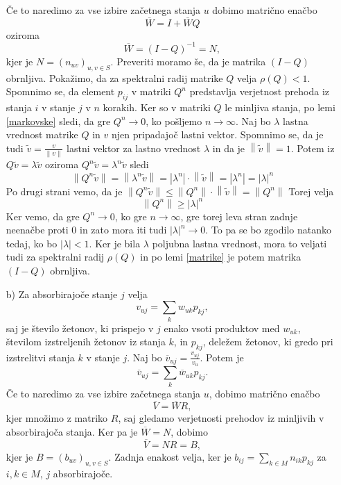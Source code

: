 \documentclass[twoside,11pt]{article}
\begin{document}
\begin{enumerate}
\noindent Če to naredimo za vse izbire začetnega stanja $u$ dobimo matrično enačbo
$$\overline{W} = I + \overline{W}Q$$
oziroma
$$\overline{W} = (I - Q)^{-1} = N,$$
kjer je $N=(n_{uv})_{u,v \in S}$. Preveriti moramo še, da je matrika $(I-Q)$ obrnljiva. Pokažimo, da za spektralni radij matrike $Q$ velja $\rho(Q) < 1$. Spomnimo se, da element $p_{ij}$ v matriki $Q^n$ predstavlja verjetnost prehoda iz stanja $i$ v stanje $j$ v $n$ korakih. Ker so v matriki $Q$ le minljiva stanja, po lemi \ref{markovske} sledi, da gre $Q^n \rightarrow 0$, ko pošljemo $n\rightarrow \infty$. Naj bo $\lambda$ lastna vrednost matrike $Q$ in $v$ njen pripadajoč lastni vektor. 
Spomnimo se, da je tudi $\widetilde{v} = \frac{v}{\left\lVert v\right\rVert }$ lastni vektor za lastno vrednost $\lambda$ in da je $\left\lVert \widetilde{v}\right\rVert = 1$. Potem iz $Q\widetilde{v} = \lambda\widetilde{v}$ oziroma $Q^n\widetilde{v} = \lambda^n\widetilde{v}$ sledi
\[
    \left\lVert Q^n\widetilde{v} \right\rVert = \left\lVert \lambda^n\widetilde{v}\right\rVert = \left\lvert \lambda^n\right\rvert\cdot \left\lVert \widetilde{v}\right\rVert = \left\lvert \lambda^n\right\rvert = \left\lvert \lambda\right\rvert^n 
\]
Po drugi strani vemo, da je $\left\lVert Q^n\widetilde{v} \right\rVert\leq \left\lVert Q^n \right\rVert \cdot \left\lVert \widetilde{v} \right\rVert = \left\lVert Q^n \right\rVert$
Torej velja
$$ \left\lVert Q^n \right\rVert \geq \left\lvert \lambda\right\rvert^n$$
Ker vemo, da gre $Q^n \rightarrow 0$, ko gre $n \rightarrow \infty$, gre torej leva stran zadnje neenačbe proti 0 in zato mora iti tudi $\left\lvert \lambda \right\rvert^n \rightarrow 0$. To pa se bo zgodilo natanko tedaj, ko bo $\left\lvert \lambda \right\rvert < 1$. Ker je bila $\lambda$ poljubna lastna vrednost, mora to veljati tudi za spektralni radij $\rho(Q)$ in po lemi \ref{matrike} je potem matrika $(I-Q)$ obrnljiva.

\item[b)] Za absorbirajoče stanje $j$ velja
$$v_{uj} = \sum_{k} w_{uk}p_{kj},$$
saj je število žetonov, ki prispejo v $j$ enako vsoti produktov med $w_{uk}$, številom izstreljenih žetonov iz stanja $k$, in $p_{kj}$, deležem žetonov, ki gredo pri izstrelitvi stanja $k$ v stanje $j$. \newline
Naj bo $\overline{v}_{uj} = \frac{v_{uj}}{v_{u}}$. Potem je
$$ \overline{v}_{uj} = \sum_{k} \overline{w}_{uk}p_{kj}.$$
Če to naredimo za vse izbire začetnega stanja $u$, dobimo matrično enačbo
$$\overline{V} = \overline{W}R,$$
kjer množimo z matriko $R$, saj gledamo verjetnosti prehodov iz minljivih v absorbirajoča stanja.
Ker pa je $\overline{W} = N$, dobimo 
$$\overline{V} = NR = B, $$
kjer je $B = (b_{uv})_{u,v \in S}$. Zadnja enakost velja, ker je $b_{ij} = \sum_{k\in M} n_{ik}p_{kj}$ za $i,k \in M$, $j$ absorbirajoče.

\hfill \QED
\end{enumerate}
\end{document}
